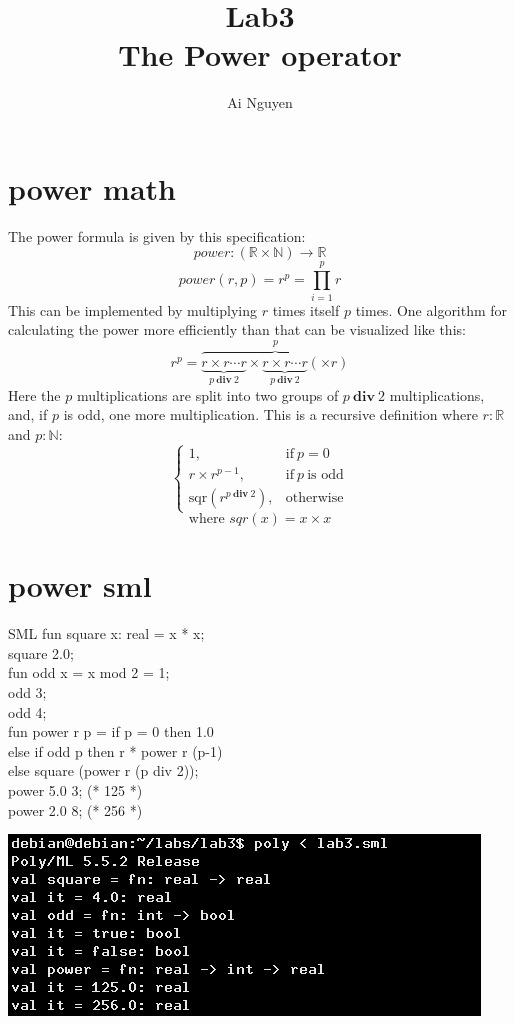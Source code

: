 \documentclass{article}
\begin{document}
\title{Lab3 \\The Power operator}
\author{Ai Nguyen}
\maketitle
\clearpage\section{power math}
The power formula is given by this specification:
\[power: (\mathbb{R} \times \mathbb{N}) \rightarrow \mathbb{R}\]
\[ power(r,p) = r^p = \prod_{i=1}^p r\]
This can be implemented by multiplying $r$ times itself $p$ times.
One algorithm for calculating the power more efficiently than that can be visualized like this:
\[r^p = \overbrace{\underbrace{r \times r \cdots r}_{p\ \mathbf{div}\ 2} \times \underbrace{r \times r \cdots r}_{p\ \mathbf{div}\ 2}(\times r)}^p \]
Here the $p$ multiplications are split into two groups of $p\ \mathbf{div}\ 2$ multiplications, and, if $p$ is odd, one more multiplication.
This is a recursive definition where 
$r: \mathbb{R}$ and $p: \mathbb{N}$:
\[
\left\{
  \begin{array}{lr}
    1, & \text{if}\ p=0 \\
    r \times r^{p-1}, & \text{if}\ p\ \text{is odd} \\
    \text{sqr}(r^{p\ \mathbf{div}\ 2}), & \text{otherwise}
  \end{array}
\right.
\]
\[\text{where }sqr(x) = x \times x\]
\clearpage\section{power sml}
\begin{multicols}{2}
\begin{GFT}{SML}
\+fun square x: real = x * x;\\
\+square 2.0;\\
\+fun odd x = x mod 2 = 1;\\
\+odd 3;\\
\+odd 4;\\
\+fun power r p = if p = 0 then 1.0\\
\+		else if odd p then r * power r (p-1)\\
\+		else square (power r (p div 2));\\
\+power 5.0 3; (* 125 *)\\
\+power 2.0 8; (* 256 *)\\
\end{GFT}
\columnbreak
\includegraphics[scale=0.75]{lab3sml.png}
\end{multicols}
\end{document}
